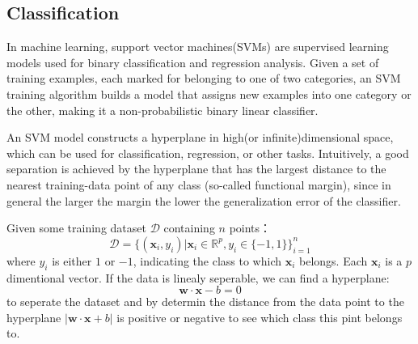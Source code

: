 \documentclass{vldb}
\begin{document}
\subsection{Classification}
In machine learning, support vector machines(SVMs) are supervised learning models used for binary classification and regression analysis. Given a set of training examples, each marked for belonging to one of two categories, an SVM training algorithm builds a model that assigns new examples into one category or the other, making it a non-probabilistic binary linear classifier. 
\par An SVM model constructs a hyperplane in high(or infinite)dimensional space, which can be used for classification, regression, or other tasks. Intuitively, a good separation is achieved by the hyperplane that has the largest distance to the nearest training-data point of any class (so-called functional margin), since in general the larger the margin the lower the generalization error of the classifier.
\par Given some training dataset $\mathcal{D}$ containing $n$ points：
\begin{displaymath}
\mathcal{D} = \{(\mathbf{x}_i,y_i)|\mathbf{x}_i \in \mathbb{R}^p,y_i\in\{-1,1\}\}^n _{i=1}
\end{displaymath}
where $y_i$ is either $1$ or $-1$, indicating the class to which $\mathbf{x}_i$ belongs. Each $\mathbf{x}_i$ is a $p$ dimentional vector. If the data is linealy seperable, we can find a hyperplane:
\begin{displaymath}
\mathbf{w}\cdot\mathbf{x}-b=0 
\end{displaymath}
to seperate the dataset and by determin the distance from the data point to the hyperplane $|\mathbf{w}\cdot\mathbf{x}+b|$ is positive or negative to see which class this pint belongs to.
\end{document}
